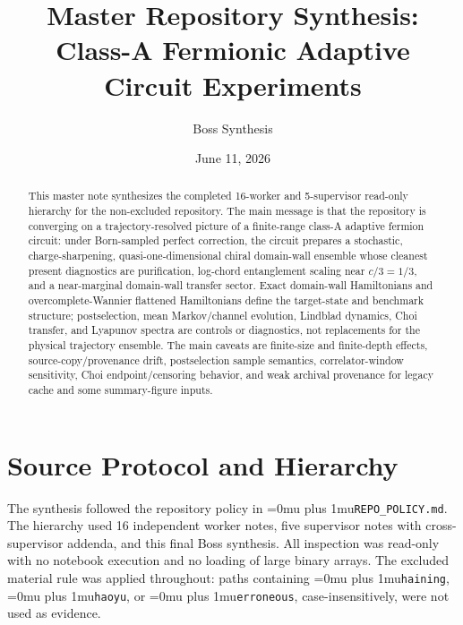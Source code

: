 \documentclass[aps,prb,onecolumn,nofootinbib,superscriptaddress]{revtex4-2}
\newcommand{\src}[1]{\begingroup\ttfamily\Urlmuskip=0mu plus 1mu\relax\nolinkurl{#1}\endgroup}
\begin{document}
\title{Master Repository Synthesis: Class-A Fermionic Adaptive Circuit Experiments}
\author{Boss Synthesis}
\date{June 11, 2026}

\begin{abstract}
This master note synthesizes the completed 16-worker and 5-supervisor read-only hierarchy for the non-excluded repository.  The main message is that the repository is converging on a trajectory-resolved picture of a finite-range class-A adaptive fermion circuit: under Born-sampled perfect correction, the circuit prepares a stochastic, charge-sharpening, quasi-one-dimensional chiral domain-wall ensemble whose cleanest present diagnostics are purification, log-chord entanglement scaling near \(c/3=1/3\), and a near-marginal domain-wall transfer sector.  Exact domain-wall Hamiltonians and overcomplete-Wannier flattened Hamiltonians define the target-state and benchmark structure; postselection, mean Markov/channel evolution, Lindblad dynamics, Choi transfer, and Lyapunov spectra are controls or diagnostics, not replacements for the physical trajectory ensemble.  The main caveats are finite-size and finite-depth effects, source-copy/provenance drift, postselection sample semantics, correlator-window sensitivity, Choi endpoint/censoring behavior, and weak archival provenance for legacy cache and some summary-figure inputs.
\end{abstract}

\maketitle
\setcounter{tocdepth}{2}
\tableofcontents

\section{Source Protocol and Hierarchy}

The synthesis followed the repository policy in \src{REPO_POLICY.md}.  The hierarchy used 16 independent worker notes, five supervisor notes with cross-supervisor addenda, and this final Boss synthesis.  All inspection was read-only with no notebook execution and no loading of large binary arrays.  The excluded material rule was applied throughout: paths containing \src{haining}, \src{haoyu}, or \src{erroneous}, case-insensitively, were not used as evidence.
\end{document}

